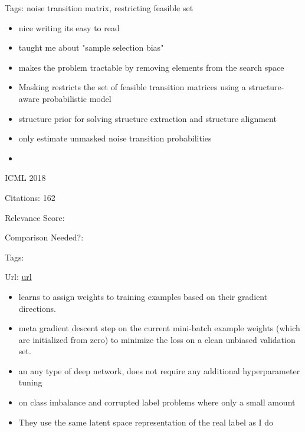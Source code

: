 \documentclass[11pt]{article}
\begin{document}
\noindent Tags: noise transition matrix, restricting feasible set

\begin{itemize}
\item nice writing its easy to read
\item taught me about "sample selection bias"
\item makes the problem tractable by removing elements from the search space
\item Masking restricts the set of feasible transition matrices using a structure-aware probabilistic model
\item structure prior for solving structure extraction
and structure alignment
\item only estimate unmasked noise
transition probabilities 
\item 
\end{itemize}

\vspace{2cm}

\noindent ICML 2018

\noindent Citations: 162

\noindent Relevance Score:

\noindent Comparison Needed?: 

\noindent Tags:

\noindent Url: \href{https://arxiv.org/pdf/1803.09050.pdf}{url}

\begin{itemize}
  \item learns to assign weights to training examples based on their gradient directions.
  \item meta gradient descent step on the current mini-batch example weights (which are initialized from zero) to minimize the loss on a clean unbiased validation set.
  \item an any type of deep network, does not require any additional hyperparameter tuning
  \item on class imbalance and corrupted label problems where only a small amount 
\end{itemize}

\begin{itemize}
\item They use the same latent space representation of the real label as I do
\end{itemize}

\vspace{2cm}
\end{document}
